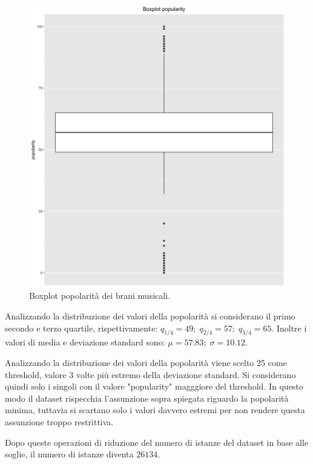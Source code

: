 \begin{figure}[H]
\centering
\includegraphics[width=14cm]{../images/popularity_boxplot.png}
\caption{Boxplot popolarità dei brani musicali.}
\end{figure}


Analizzando la distribuzione dei valori della popolarità si considerano il primo secondo e terzo quartile, rispettivamente: $q_{1/4} = 49; \; q_{2/4}= 57; \; q_{3/4} = 65$. Inoltre i valori di media e deviazione standard sono: $\mu = 57.83; \; \sigma = 10.12$.

Analizzando la distribuzione dei valori della popolarità viene scelto 25 come threshold, valore 3 volte più estremo della deviazione standard. Si considerano quindi solo i singoli con il valore "popularity" magggiore del threshold. In questo modo il dataset rispecchia l'assunzione sopra spiegata riguardo la popolarità minima, tuttavia si scartano solo i valori davvero estremi per non rendere questa assunzione troppo restrittiva.

Dopo queste operazioni di riduzione del numero di istanze del dataset in base alle soglie, il numero di istanze diventa $26134$.



